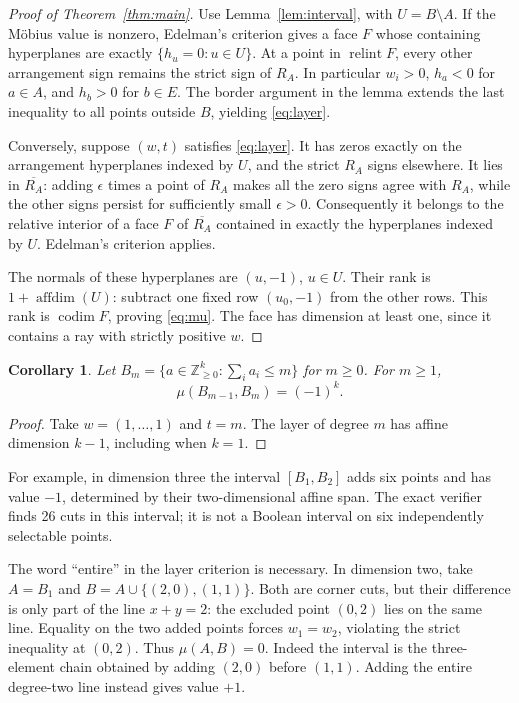 \documentclass[11pt]{article}
\newtheorem{corollary}[theorem]{Corollary}
\theoremstyle{remark}
\newcommand{\NN}{\mathbb Z_{\geq0}}
\newcommand{\affdim}{\operatorname{affdim}}
\newcommand{\codim}{\operatorname{codim}}
\begin{document}
\begin{proof}[Proof of Theorem~\ref{thm:main}]
Use Lemma~\ref{lem:interval}, with $U=B\setminus A$.
If the M\"obius value is nonzero, Edelman's criterion gives a face $F$
whose containing hyperplanes are exactly $\{h_u=0:u\in U\}$.
At a point in $\operatorname{relint}F$, every other arrangement sign
remains the strict sign of $R_A$. In particular $w_i>0$, $h_a<0$ for
$a\in A$, and $h_b>0$ for $b\in E$. The border argument in the lemma
extends the last inequality to all points outside $B$, yielding
\eqref{eq:layer}.

Conversely, suppose $(w,t)$ satisfies \eqref{eq:layer}. It has zeros
exactly on the arrangement hyperplanes indexed by $U$, and the strict
$R_A$ signs elsewhere. It lies in $\overline{R_A}$: adding $\epsilon$
times a point of $R_A$ makes all the zero signs agree with $R_A$, while
the other signs persist for sufficiently small $\epsilon>0$.
Consequently it belongs to the relative interior of a face $F$ of
$\overline{R_A}$ contained in exactly the hyperplanes indexed by $U$.
Edelman's criterion applies.

The normals of these hyperplanes are $(u,-1)$, $u\in U$. Their rank is
$1+\affdim(U)$: subtract one fixed row $(u_0,-1)$ from the other rows.
This rank is $\codim F$, proving \eqref{eq:mu}. The face has dimension
at least one, since it contains a ray with strictly positive $w$.
\end{proof}

\begin{corollary}
Let $B_m=\{a\in\NN^k:\sum_i a_i\leq m\}$ for $m\geq0$. For $m\geq1$,
\[
 \mu(B_{m-1},B_m)=(-1)^k.
\]
\end{corollary}
\begin{proof}
Take $w=(1,\ldots,1)$ and $t=m$. The layer of degree $m$ has affine
dimension $k-1$, including when $k=1$.
\end{proof}

For example, in dimension three the interval $[B_1,B_2]$ adds six points
and has value $-1$, determined by their two-dimensional affine span.
The exact verifier finds 26 cuts in this interval; it is not a Boolean
interval on six independently selectable points.

The word ``entire'' in the layer criterion is necessary. In dimension two,
take $A=B_1$ and $B=A\cup\{(2,0),(1,1)\}$. Both are corner cuts, but
their difference is only part of the line $x+y=2$: the excluded point
$(0,2)$ lies on the same line. Equality on the two added points forces
$w_1=w_2$, violating the strict inequality at $(0,2)$. Thus $\mu(A,B)=0$.
Indeed the interval is the three-element chain obtained by adding $(2,0)$
before $(1,1)$. Adding the entire degree-two line instead gives value $+1$.
\end{document}

